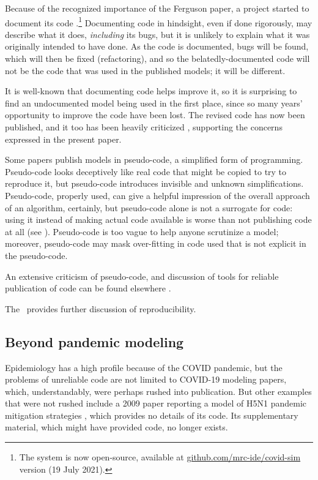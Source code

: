 \documentclass{comjnl}
\begin{document}
Because of the recognized importance of the Ferguson paper, a project started to document its code  \cite{refactoring}.\footnote{The system is now open-source, available at \url{github.com/mrc-ide/covid-sim} version (19 July 2021).} Documenting code in hindsight, even if done rigorously, may describe what it does, \emph{including\/} its bugs, but it is unlikely to explain what it was originally intended to have done. As the code is documented, bugs will be found, which will then be fixed (refactoring), and so the belatedly-documented code will not be the code that was used in the published models; it will be different. 

It is well-known that documenting code helps improve it, so it is surprising to find an undocumented model being used in the first place, since so many years' opportunity to improve the code have been lost. The revised code has now been published, and it too has been heavily criticized , supporting the concerns expressed in the present paper.

Some papers  publish models in pseudo-code, a simplified form of programming. Pseudo-code looks deceptively like real code that might be copied to try to reproduce it, but pseudo-code introduces invisible and unknown simplifications. Pseudo-code, properly used, can give a helpful impression of the overall approach of an algorithm, certainly, but pseudo-code alone is not a surrogate for code: using it instead of making actual code available is worse than not publishing code at all (see \cite{chinese}). Pseudo-code is too vague to help anyone scrutinize a model; moreover, pseudo-code may mask over-fitting in code used that is not explicit in the pseudo-code. 

An extensive criticism of pseudo-code, and discussion of tools for reliable publication of code can be found elsewhere \cite{relit}. 

The \supplement\ provides further discussion of reproducibility.

\subsection{Beyond pandemic modeling}
\label{section-science-beyond-pandemic-modeling}

Epidemiology has a high profile because of the COVID pandemic, but the problems of unreliable code are not limited to COVID-19 modeling papers, which, understandably, were perhaps rushed into publication. But other examples that were not rushed include a 2009 paper reporting a model of H5N1 pandemic mitigation strategies \cite{flu-model}, which provides no details of its code. Its supplementary material, which might have provided code, no longer exists.
\end{document}
